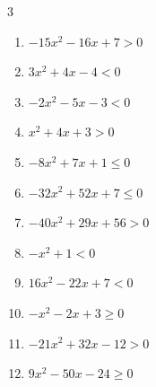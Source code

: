 \begin{multicols}{3}
\begin{enumerate}

  \item $-15x^{2}-16x+7>0$


  \item $3x^{2}+4x-4<0$


  \item $-2x^{2}-5x-3<0$


  \item $x^{2}+4x+3>0$

        \phantom{$\displaystyle x < -3 , \; -1 < x$}

  \item $-8x^{2}+7x+1\leq 0$


  \item $-32x^{2}+52x+7\leq 0$


\columnbreak %

  \item $-40x^{2}+29x+56>0$


  \item $-x^{2}+1<0$

        \phantom{$\displaystyle x < -1 , \; 1 < x$}

  \item $16x^{2}-22x+7<0$


  \item $-x^{2}-2x+3\geq 0$

        \phantom{$\displaystyle -3 \leqq x \leqq 1$}

  \item $-21x^{2}+32x-12>0$


  \item $9x^{2}-50x-24\geq 0$


\end{enumerate}
\end{multicols}
